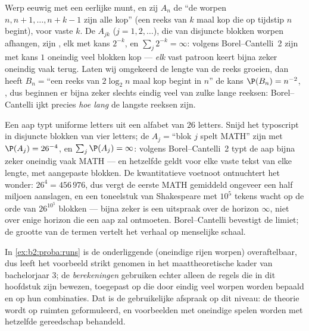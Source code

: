\begin{example}\label{ex:b2:proba:runs}
Werp eeuwig met een eerlijke munt, en zij $A_n$ de  ``de
worpen $n, n+1, \dots, n + k - 1$ zijn alle kop'' (een reeks van
$k$ maal kop die op tijdstip $n$ begint), voor vaste $k$. De
 $A_{jk}$ ($j = 1, 2, \dots$), die van disjuncte
blokken worpen afhangen, zijn , elk met kans $2^{-k}$,
en $\sum_j 2^{-k} = \infty$: volgens Borel--Cantelli~2 zijn met
kans $1$ oneindig veel blokken  kop --- \emph{elk} vast
patroon keert bijna zeker oneindig vaak terug. Laten wij omgekeerd
de lengte van de reeks groeien, dan heeft $B_n = {}$``een reeks van
$2\log_2 n$ maal kop begint in $n$'' de kans $\P(B_n) = n^{-2}$,
, dus beginnen er bijna zeker slechts eindig veel van
zulke lange reeksen: Borel--Cantelli ijkt precies \emph{hoe lang}
de langste reeksen zijn.
\end{example}

\begin{example}
Een aap typt  uniforme letters uit een alfabet van
$26$ letters. Snijd het typoscript in disjuncte blokken van vier
letters; de  $A_j = {}$``blok $j$ spelt MATH'' zijn
 met $\P(A_j) = 26^{-4}$, en $\sum_j\P(A_j) = \infty$:
volgens Borel--Cantelli~2 typt de aap bijna zeker oneindig vaak
MATH --- en hetzelfde geldt voor elke vaste tekst van elke lengte,
met aangepaste blokken. De kwantitatieve voetnoot ontnuchtert het
wonder: $26^4 = 456\,976$, dus vergt de eerste MATH gemiddeld
ongeveer een half miljoen aanslagen, en een toneelstuk van
Shakespeare met $10^5$ tekens wacht op de orde van $26^{10^5}$
blokken --- bijna zeker is een uitspraak over de horizon $\infty$,
niet over enige horizon die een aap zal ontmoeten.
Borel--Cantelli bevestigt de limiet; de grootte van de termen
vertelt het verhaal op menselijke schaal.
\end{example}

\begin{remark}
In \cref{ex:b2:proba:runs} is de onderliggende 
(oneindige rijen worpen) overaftelbaar, dus leeft het voorbeeld
strikt genomen in het maattheoretische kader van bachelorjaar 3; de
\emph{berekeningen} gebruiken echter alleen de regels die in dit
hoofdstuk zijn bewezen, toegepast op  die door
eindig veel worpen worden bepaald en op hun  combinaties.
Dat is de gebruikelijke afspraak op dit niveau: de theorie wordt op
 ruimten geformuleerd, en voorbeelden met oneindige spelen
worden met hetzelfde gereedschap behandeld.
\end{remark}

